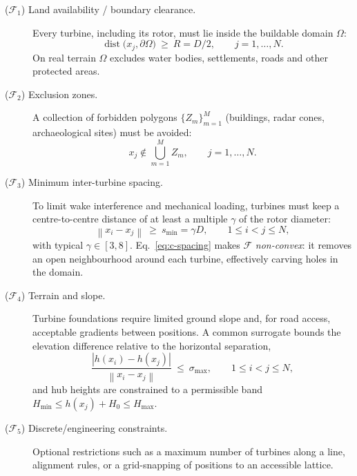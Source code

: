 \documentclass[11pt,a4paper]{article}
\newcommand{\norm}[1]{\left\lVert #1 \right\rVert}
\newcommand{\abs}[1]{\left\lvert #1 \right\rvert}
\begin{document}
\begin{description}
  \item[($\mathcal{F}_{1}$) Land availability / boundary clearance.] Every
  turbine, including its rotor, must lie inside the buildable domain $\Omega$:
  \begin{equation}
    \operatorname{dist}\!\bigl(x_{j}, \partial\Omega\bigr) \ \ge \ R = D/2,
    \qquad j=1,\dots,N .
    \label{eq:c-boundary}
  \end{equation}
  On real terrain $\Omega$ excludes water bodies, settlements, roads and other
  protected areas.

  \item[($\mathcal{F}_{2}$) Exclusion zones.] A collection of forbidden
  polygons $\{Z_{m}\}_{m=1}^{M}$ (buildings, radar cones, archaeological sites)
  must be avoided:
  \begin{equation}
    x_{j} \notin \bigcup_{m=1}^{M} Z_{m},
    \qquad j=1,\dots,N .
    \label{eq:c-exclusion}
  \end{equation}

  \item[($\mathcal{F}_{3}$) Minimum inter-turbine spacing.] To limit wake
  interference and mechanical loading, turbines must keep a centre-to-centre
  distance of at least a multiple $\gamma$ of the rotor diameter:
  \begin{equation}
    \norm{x_{i}-x_{j}} \ \ge \ s_{\min} = \gamma D,
    \qquad 1 \le i < j \le N,
    \label{eq:c-spacing}
  \end{equation}
  with typical $\gamma \in [3,8]$.
  Eq.~\eqref{eq:c-spacing} makes $\mathcal{F}$ \emph{non-convex}: it removes an
  open neighbourhood around each turbine, effectively carving holes in the
  domain.

  \item[($\mathcal{F}_{4}$) Terrain and slope.] Turbine foundations require
  limited ground slope and, for road access, acceptable gradients between
  positions. A common surrogate bounds the elevation difference relative to the
  horizontal separation,
  \begin{equation}
    \frac{\abs{h(x_{i})-h(x_{j})}}{\norm{x_{i}-x_{j}}}
      \ \le \ \sigma_{\max},
    \qquad 1\le i<j\le N ,
    \label{eq:c-slope}
  \end{equation}
  and hub heights are constrained to a permissible band
  $H_{\min}\le h(x_{j})+H_{0}\le H_{\max}$.

  \item[($\mathcal{F}_{5}$) Discrete/engineering constraints.] Optional
  restrictions such as a maximum number of turbines along a line, alignment
  rules, or a grid-snapping of positions to an accessible lattice.
\end{description}
\end{document}

